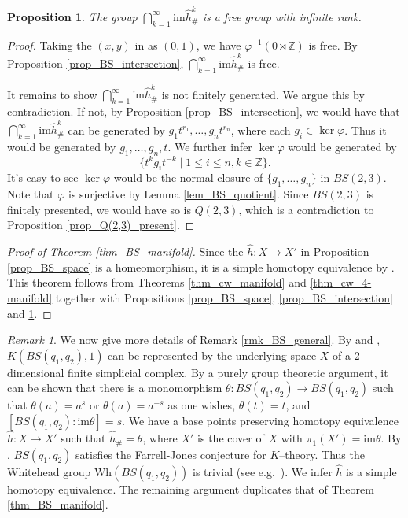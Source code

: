 \documentclass[12pt]{amsart}
\theoremstyle{plain}
\newtheorem{proposition}[theorem]{Proposition}
\theoremstyle{definition}
\theoremstyle{question}
\theoremstyle{remark}
\newtheorem{remark}[theorem]{Remark}
\theoremstyle{assumption}
\numberwithin{equation}{section}
\theoremstyle{bigthm}
\begin{document}
\begin{proposition}\label{prop_infinite_rank}
The group $\bigcap_{k=1}^{\infty} \mathrm{im} \hat{h}_{\#}^{k}$ is a free group with infinite rank.
\end{proposition}
\begin{proof}
Taking the $(x,y)$ in \cite[Proposition~2.1]{Farrell_Wu} as $(0,1)$, we have $\varphi^{-1} (0 \rtimes \mathbb{Z})$ is free. By Proposition \ref{prop_BS_intersection}, $\bigcap_{k=1}^{\infty} \mathrm{im} \hat{h}_{\#}^{k}$ is free.

It remains to show $\bigcap_{k=1}^{\infty} \mathrm{im} \hat{h}_{\#}^{k}$ is not finitely generated. We argue this by contradiction. If not, by Proposition \ref{prop_BS_intersection}, we would have that $\bigcap_{k=1}^{\infty} \mathrm{im} \hat{h}_{\#}^{k}$ can be generated by $g_{1} t^{r_{1}}, \dots, g_{n} t^{r_{n}}$, where each $g_{i} \in \ker \varphi$. Thus it would be generated by $g_{1}, \dots, g_{n}, t$. We further infer $\ker \varphi$ would be generated by
\[
\{ t^{k} g_{i} t^{-k} \mid 1 \leq i \leq n, k \in \mathbb{Z} \}.
\]
It's easy to see $\ker \varphi$ would be the normal closure of $\{ g_{1}, \dots, g_{n} \}$ in $BS(2,3)$. Note that $\varphi$ is surjective by Lemma \ref{lem_BS_quotient}. Since $BS(2,3)$ is finitely presented, we would have so is $Q(2,3)$, which is a contradiction to Proposition \ref{prop_Q(2,3)_present}.
\end{proof}

\begin{proof}[Proof of Theorem \ref{thm_BS_manifold}]
Since the $\hat{h} \colon  X \rightarrow X'$ in Proposition \ref{prop_BS_space} is a homeomorphism, it is a simple homotopy equivalence by \cite[Theorem~1]{Chapman}. This theorem follows from Theorems \ref{thm_cw_manifold} and \ref{thm_cw_4-manifold} together with Propositions \ref{prop_BS_space}, \ref{prop_BS_intersection} and \ref{prop_infinite_rank}.
\end{proof}

\begin{remark}\label{rmk_BS_proof}
We now give more details of Remark \ref{rmk_BS_general}. By \cite[Corollary~5.4]{Howie} and \cite[Theorem~13]{Whitehead}, $K(BS(q_{1}, q_{2}), 1)$ can be represented by the underlying space $X$ of a $2$-dimensional finite simplicial complex. By a purely group theoretic argument, it can be shown that there is a monomorphism $\theta \colon  BS(q_{1}, q_{2}) \rightarrow BS(q_{1}, q_{2})$ such that $\theta (a) = a^{s}$ or $\theta (a) = a^{-s}$ as one wishes, $\theta (t) = t$, and $[BS(q_{1}, q_{2}) : \mathrm{im} \theta] = s$. We have a base points preserving homotopy equivalence $\hat{h} \colon  X \rightarrow X'$ such that $\hat{h}_{\#} = \theta$, where $X'$ is the cover of $X$ with $\pi_{1} (X') = \mathrm{im} \theta$. By \cite{Farrell_Wu}, $BS(q_{1}, q_{2})$ satisfies the Farrell-Jones conjecture for $K$--theory. Thus the Whitehead group $\mathrm{Wh} (BS(q_{1}, q_{2}))$ is trivial (see e.g.~\cite[Remark~2.2]{Luck}). We infer $\hat{h}$ is a simple homotopy equivalence. The remaining argument duplicates that of Theorem \ref{thm_BS_manifold}.
\end{remark}
\end{document}
